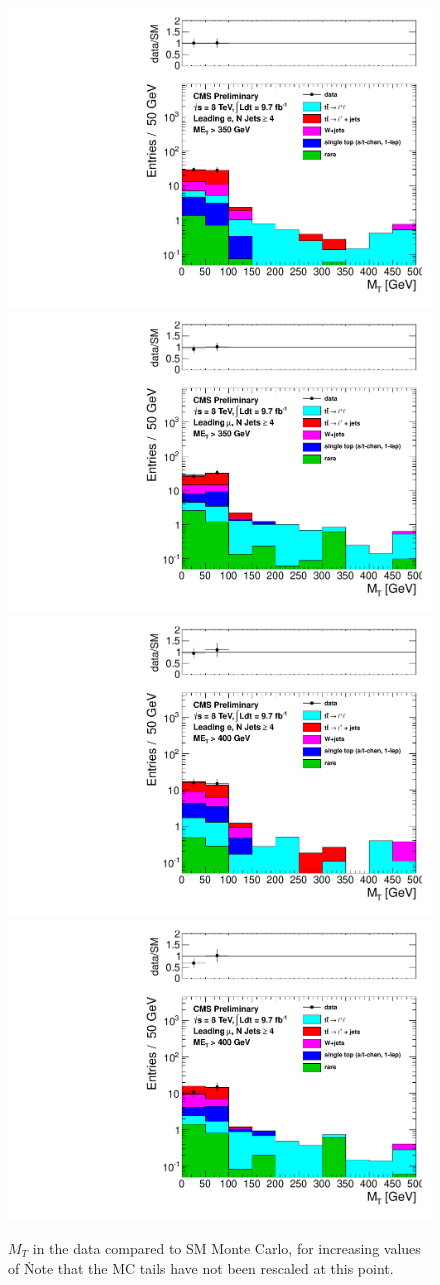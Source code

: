 \begin{figure}[hbt]
  \begin{center}
        \includegraphics[width=0.5\linewidth]{plots/mt_met350_ele.pdf}%
        \includegraphics[width=0.5\linewidth]{plots/mt_met350_muo.pdf}
        \includegraphics[width=0.5\linewidth]{plots/mt_met400_ele.pdf}%
        \includegraphics[width=0.5\linewidth]{plots/mt_met400_muo.pdf}

    \caption{$M_T$ in the data compared to SM Monte Carlo, for
      increasing values of \met\.  Note that the MC tails have not
      been rescaled at this point.
\label{fig:mtsig3}
}  
      \end{center}
\end{figure}

\clearpage
